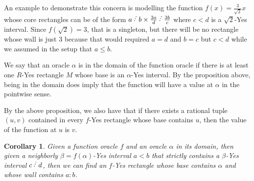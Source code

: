 \documentclass[12pt]{article}
\newtheorem{corollary}{Corollary}[subsection]
\begin{document}
An example to demonstrate this concern is modelling the function $f(x) = \frac{3}{\sqrt{2}}x$ whose core rectangles can be of the form $a\lte b \times \frac{3a}{d} \lte \frac{3b}{c}$ where $c\lt d$ is a $\sqrt{2}$-Yes interval.  Since $f(\sqrt{2}) = 3$, that is a singleton, but there will be no rectangle whose wall is just $3$ because that would required $a=d$ and $b=c$ but $c < d$ while we assumed in the setup that $a \leq b$. 

We say that an oracle $\alpha$ is in the domain of the function oracle if there is at least one $R$-Yes rectangle $M$ whose base is an $\alpha$-Yes interval. By the proposition above, being in the domain does imply that the function will have a value at $\alpha$ in the pointwise sense. 

By the above proposition, we also have that if there exists a rational tuple $(u,v)$ contained in every $f$-Yes rectangle whose base contains $u$, then the value of the function at $u$ is $v$.


\begin{corollary}\label{cor:wallorac}
    Given a function oracle $f$ and an oracle $\alpha$ in its domain, then given a neighborly $\beta=f(\alpha)$-Yes interval $a\lt b$ that strictly contains a $\beta$-Yes interval $c \lte d$, then we can find an $f$-Yes rectangle whose base contains $\alpha$ and whose wall contains $a:b$.
\end{corollary}
\end{document}

